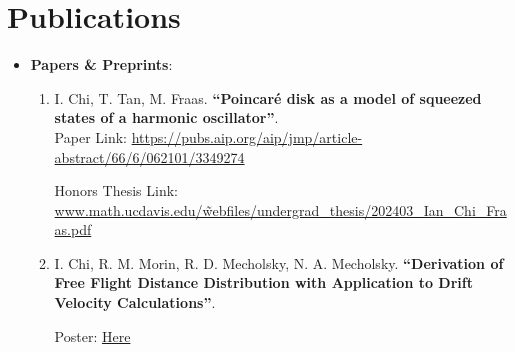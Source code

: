 \documentclass{curriculum-vitae}
\begin{document}
\section{Publications}
\begin{itemize}
    \item\textbf{Papers \& Preprints}:
    \begin{enumerate}
        \item\label{pub: pub1} I. Chi, T. Tan, M. Fraas. \textbf{``Poincar\'e disk as a model of squeezed states of a harmonic oscillator''}. \\
        Paper Link: \hyperlink{https://pubs.aip.org/aip/jmp/article-abstract/66/6/062101/3349274}{https://pubs.aip.org/aip/jmp/article-abstract/66/6/062101/3349274}

        Honors Thesis Link: \hyperlink{https://tinyurl.com/2pj46txh}{www.math.ucdavis.edu/\~webfiles/undergrad\_thesis/202403\_Ian\_Chi\_Fraas.pdf}
        \item\label{pub: pub2} I. Chi, R. M. Morin, R. D. Mecholsky, N. A. Mecholsky. \textbf{``Derivation of Free Flight Distance Distribution with Application to Drift Velocity Calculations''}.
         
        Poster: \hyperlink{https://drive.google.com/file/d/1rUFjoE8ORksClzMPz6evIloqEMJk0EOd/view}{Here}%
    \end{enumerate}

\end{itemize}
\end{document}
